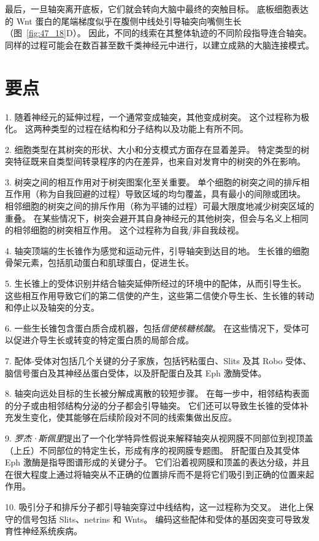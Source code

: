 最后，一旦轴突离开底板，它们就会转向大脑中最终的突触目标。
底板细胞表达的 Wnt 蛋白的尾端梯度似乎在腹侧中线处引导轴突向嘴侧生长（图~\ref{fig:47_18}D）。
因此，不同的线索在其整体轨迹的不同阶段指导连合轴突。
同样的过程可能会在数百甚至数千类神经元中进行，以建立成熟的大脑连接模式。



\section{要点}

1. 随着神经元的延伸过程，一个通常变成轴突，其他变成树突。
这个过程称为极化。
这两种类型的过程在结构和分子结构以及功能上有所不同。 


2. 细胞类型在其树突的形状、大小和分支模式方面存在显着差异。
特定类型的树突特征既来自类型间转录程序的内在差异，也来自对发育中的树突的外在影响。


3. 树突之间的相互作用对于树突图案化至关重要。
单个细胞的树突之间的排斥相互作用（称为自我回避的过程）导致区域的均匀覆盖，具有最小的间隙或团块。
相邻细胞的树突之间的排斥作用（称为平铺的过程）可最大限度地减少树突区域的重叠。
在某些情况下，树突会避开其自身神经元的其他树突，但会与名义上相同的相邻细胞的树突相互作用。
这个过程称为自我/非自我歧视。


4. 轴突顶端的生长锥作为感觉和运动元件，引导轴突到达目的地。
生长锥的细胞骨架元素，包括肌动蛋白和肌球蛋白，促进生长。


5. 生长锥上的受体识别并结合轴突延伸所经过的环境中的配体，从而引导生长。
这些相互作用导致它们的第二信使的产生，这些第二信使介导生长、生长锥的转动和停止以及轴突的分支。


6. 一些生长锥包含蛋白质合成机器，包括\textit{信使核糖核酸}。
在这些情况下，受体可以促进介导生长或转变的特定蛋白质的局部合成。


7. 配体-受体对包括几个关键的分子家族，包括钙粘蛋白、Slits 及其 Robo 受体、脑信号蛋白及其神经丛蛋白受体，以及肝配蛋白及其 Eph 激酶受体。


8. 轴突向远处目标的生长被分解成离散的较短步骤。 在每一步中，相邻结构表面的分子或由相邻结构分泌的分子都会引导轴突。
它们还可以导致生长锥的受体补充发生变化，使其能够在后续阶段对不同的线索集做出反应。


9. \textit{罗杰·斯佩里}提出了一个化学特异性假说来解释轴突从视网膜不同部位到视顶盖（上丘）不同部位的特定生长，形成有序的视网膜专题图。
肝配蛋白及其受体 Eph 激酶是指导图谱形成的关键分子。
它们沿着视网膜和顶盖的表达分级，并且在很大程度上通过将轴突从不正确的位置排斥而不是将它们吸引到正确的位置来起作用。


10. 吸引分子和排斥分子都引导轴突穿过中线结构，这一过程称为交叉。
进化上保守的信号包括 Slits、netrins 和 Wnts。
编码这些配体和受体的基因突变可导致发育性神经系统疾病。

